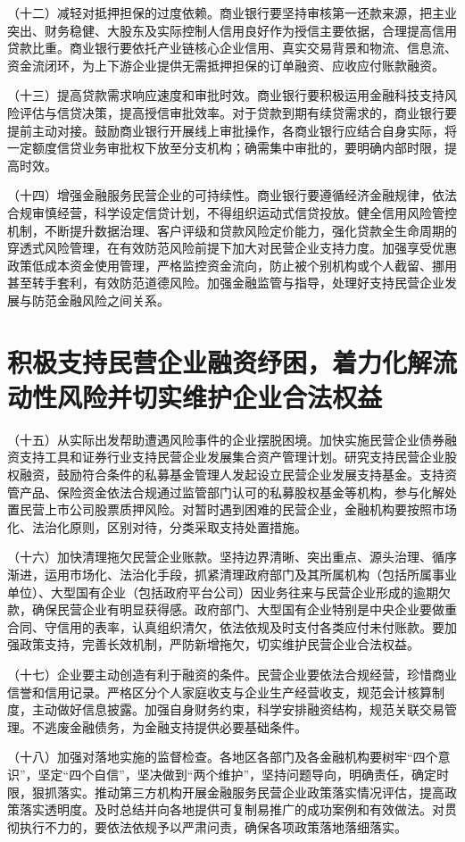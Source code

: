 （十二）减轻对抵押担保的过度依赖。商业银行要坚持审核第一还款来源，把主业突出、财务稳健、大股东及实际控制人信用良好作为授信主要依据，合理提高信用贷款比重。商业银行要依托产业链核心企业信用、真实交易背景和物流、信息流、资金流闭环，为上下游企业提供无需抵押担保的订单融资、应收应付账款融资。

（十三）提高贷款需求响应速度和审批时效。商业银行要积极运用金融科技支持风险评估与信贷决策，提高授信审批效率。对于贷款到期有续贷需求的，商业银行要提前主动对接。鼓励商业银行开展线上审批操作，各商业银行应结合自身实际，将一定额度信贷业务审批权下放至分支机构；确需集中审批的，要明确内部时限，提高时效。

（十四）增强金融服务民营企业的可持续性。商业银行要遵循经济金融规律，依法合规审慎经营，科学设定信贷计划，不得组织运动式信贷投放。健全信用风险管控机制，不断提升数据治理、客户评级和贷款风险定价能力，强化贷款全生命周期的穿透式风险管理，在有效防范风险前提下加大对民营企业支持力度。加强享受优惠政策低成本资金使用管理，严格监控资金流向，防止被个别机构或个人截留、挪用甚至转手套利，有效防范道德风险。加强金融监管与指导，处理好支持民营企业发展与防范金融风险之间关系。

\section{积极支持民营企业融资纾困，着力化解流动性风险并切实维护企业合法权益}

（十五）从实际出发帮助遭遇风险事件的企业摆脱困境。加快实施民营企业债券融资支持工具和证券行业支持民营企业发展集合资产管理计划。研究支持民营企业股权融资，鼓励符合条件的私募基金管理人发起设立民营企业发展支持基金。支持资管产品、保险资金依法合规通过监管部门认可的私募股权基金等机构，参与化解处置民营上市公司股票质押风险。对暂时遇到困难的民营企业，金融机构要按照市场化、法治化原则，区别对待，分类采取支持处置措施。

（十六）加快清理拖欠民营企业账款。坚持边界清晰、突出重点、源头治理、循序渐进，运用市场化、法治化手段，抓紧清理政府部门及其所属机构（包括所属事业单位）、大型国有企业（包括政府平台公司）因业务往来与民营企业形成的逾期欠款，确保民营企业有明显获得感。政府部门、大型国有企业特别是中央企业要做重合同、守信用的表率，认真组织清欠，依法依规及时支付各类应付未付账款。要加强政策支持，完善长效机制，严防新增拖欠，切实维护民营企业合法权益。

（十七）企业要主动创造有利于融资的条件。民营企业要依法合规经营，珍惜商业信誉和信用记录。严格区分个人家庭收支与企业生产经营收支，规范会计核算制度，主动做好信息披露。加强自身财务约束，科学安排融资结构，规范关联交易管理。不逃废金融债务，为金融支持提供必要基础条件。

（十八）加强对落地实施的监督检查。各地区各部门及各金融机构要树牢“四个意识”，坚定“四个自信”，坚决做到“两个维护”，坚持问题导向，明确责任，确定时限，狠抓落实。推动第三方机构开展金融服务民营企业政策落实情况评估，提高政策落实透明度。及时总结并向各地提供可复制易推广的成功案例和有效做法。对贯彻执行不力的，要依法依规予以严肃问责，确保各项政策落地落细落实。
